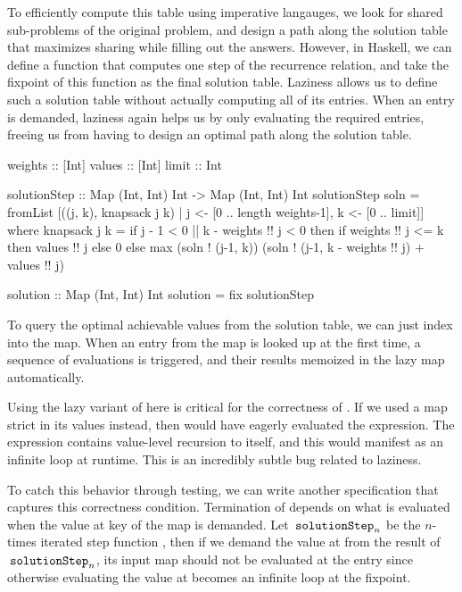 \documentclass[acmsmall,review]{acmart}\settopmatter{}
\begin{document}
To efficiently compute this table using imperative langauges, we look
for shared sub-problems of the original problem, and design a path
along the solution table that maximizes sharing while filling out the
answers.
%
However, in Haskell, we can define a function that computes one step
of the recurrence relation, and take the fixpoint of this function as
the final solution table. Laziness allows us to define such a solution
table without actually computing all of its entries. When an entry is
demanded, laziness again helps us by only evaluating the required
entries, freeing us from having to design an optimal path along the
solution table.
%
\begin{inlinecode}
weights :: [Int]
values  :: [Int]
limit   :: Int

solutionStep :: Map (Int, Int) Int -> Map (Int, Int) Int
solutionStep soln =
  fromList [((j, k), knapsack j k) |
            j <- [0 .. length weights-1], k <- [0 .. limit]]
  where
    knapsack j k = if j - 1 < 0 || k - weights !! j < 0
                   then if weights !! j <= k then values !! j else 0
                   else max (soln ! (j-1, k))
                            (soln ! (j-1, k - weights !! j) + values !! j)

solution :: Map (Int, Int) Int
solution = fix solutionStep

\end{inlinecode}
%
To query the optimal achievable values from the solution table, we can
just index into the map. When an entry from the map is looked up at
the first time, a sequence of evaluations is triggered, and their
results memoized in the lazy map automatically.

Using the lazy variant of  here is critical for the
correctness of . If we used a map strict in its values
instead, then  would have eagerly evaluated the 
expression. The  expression contains value-level recursion to
 itself, and this would manifest as an infinite loop
at runtime. This is an incredibly subtle bug related to laziness.

To catch this behavior through testing, we can write another
specification that captures this correctness condition. Termination
of  depends on what is evaluated when the value at
key  of the map is demanded. Let $\lk{solutionStep}_n$ be
the $n$-times iterated step function , then if we demand the value at  from
the result of $\lk{solutionStep}_n$, its input map should not be
evaluated at the  entry since otherwise evaluating the
value at  becomes an infinite loop at the fixpoint.
\end{document}
